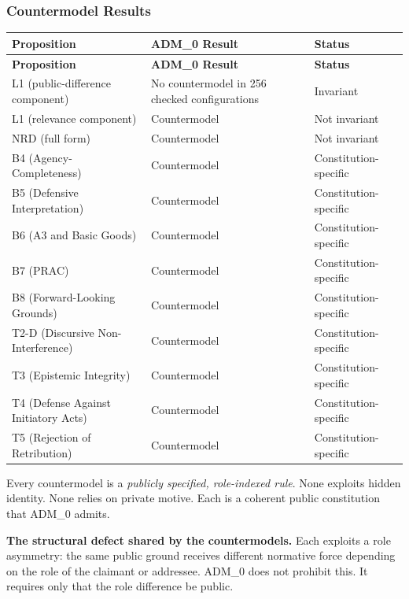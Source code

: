 \documentclass[11pt]{article}
\def\ensuremath#1{#1}%
\def\mathrm#1{#1}%
\newcommand{\ADM}{\texorpdfstring{\ensuremath{\mathrm{ADM}_0}}{ADM0}}
\begin{document}
\subsubsection{Countermodel Results}
\begin{longtable}{@{}L{3.9cm} L{5.6cm} L{6.4cm}@{}}
\toprule
\textbf{Proposition} & \textbf{\ADM{} Result} & \textbf{Status} \\
\midrule
\endfirsthead
\toprule
\textbf{Proposition} & \textbf{\ADM{} Result} & \textbf{Status} \\
\midrule
\endhead
\bottomrule
\endfoot
L1 (public-difference component) & No countermodel in 256 checked configurations & Invariant \\
L1 (relevance component) & Countermodel & Not invariant \\
NRD (full form) & Countermodel & Not invariant \\
B4 (Agency-Completeness) & Countermodel & Constitution-specific \\
B5 (Defensive Interpretation) & Countermodel & Constitution-specific \\
B6 (A3 and Basic Goods) & Countermodel & Constitution-specific \\
B7 (PRAC) & Countermodel & Constitution-specific \\
B8 (Forward-Looking Grounds) & Countermodel & Constitution-specific \\
T2-D (Discursive Non-Interference) & Countermodel & Constitution-specific \\
T3 (Epistemic Integrity) & Countermodel & Constitution-specific \\
T4 (Defense Against Initiatory Acts) & Countermodel & Constitution-specific \\
T5 (Rejection of Retribution) & Countermodel & Constitution-specific \\
\end{longtable}
Every countermodel is a \emph{publicly specified, role-indexed rule}. None exploits hidden identity. None relies on private motive. Each is a coherent public constitution that \ADM{} admits.

\textbf{The structural defect shared by the countermodels.} Each exploits a role asymmetry: the same public ground receives different normative force depending on the role of the claimant or addressee. \ADM{} does not prohibit this. It requires only that the role difference be public.
\end{document}
